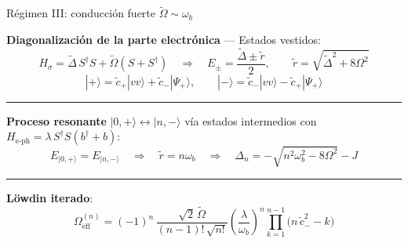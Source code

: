 \documentclass[
11pt,notheorems,hyperref={pdfauthor=whatever}
]{beamer}
\begin{document}
\begin{frame}{Régimen III: conducción fuerte \texorpdfstring{$\widetilde{\Omega} \sim \omega_b$}{}}
	
	\textbf{Diagonalización de la parte electrónica} — Estados vestidos:
	\begin{equation*}
		H_\sigma = \widetilde\Delta\,S^\dagger S + \widetilde\Omega(S+S^\dagger)
		\quad\Rightarrow\quad
		E_\pm = \frac{\widetilde\Delta \pm \tilde{r}}{2},
		\qquad
		\tilde{r} = \sqrt{\widetilde\Delta^2 + 8\Omega^2}
	\end{equation*}
	\begin{equation*}
		|{+}\rangle = \tilde{c}_+|vv\rangle + \tilde{c}_-|\Psi_+\rangle,
		\qquad
		|{-}\rangle = \tilde{c}_-|vv\rangle - \tilde{c}_+|\Psi_+\rangle
	\end{equation*}
	
	\vspace{4pt}
	\rule{\textwidth}{0.4pt}
	\vspace{2pt}
	
	\textbf{Proceso resonante} $|0,{+}\rangle \leftrightarrow |n,{-}\rangle$
	vía estados intermedios con $H_\mathrm{e\text{-}ph} = \lambda\,S^\dagger S(b^\dagger+b)$:
	\begin{equation*}
		E_{|0,+\rangle} = E_{|n,-\rangle}
		\quad\Rightarrow\quad
		\tilde{r} = n\omega_b
		\quad\Rightarrow\quad
		\boxed{\Delta_n = -\sqrt{n^2\omega_b^2 - 8\Omega^2} - J}
	\end{equation*}
	
	\vspace{4pt}
	\rule{\textwidth}{0.4pt}
	\vspace{2pt}
	
	\textbf{Löwdin iterado}:
	\begin{equation*}
		\boxed{
			\Omega_\mathrm{eff}^{(n)}
			= (-1)^n\,\frac{\sqrt{2}\,\widetilde\Omega}{(n-1)!\,\sqrt{n!}}
			\left(\frac{\lambda}{\omega_b}\right)^{\!n}
			\prod_{k=1}^{n-1}\!\bigl(n\,\tilde{c}_-^2 - k\bigr)
		}
	\end{equation*}
	
\end{frame}
\end{document}
